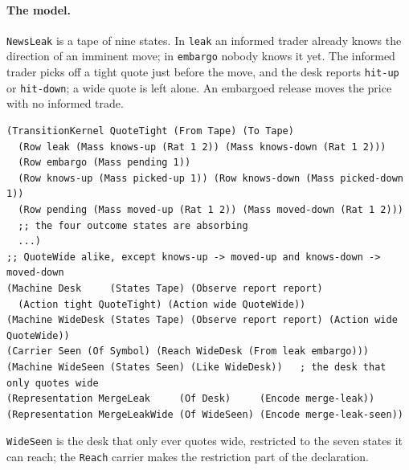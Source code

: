 \documentclass[11pt]{article}
\newcommand{\code}[1]{\texttt{#1}}
\theoremstyle{definition}
\theoremstyle{plain}
\begin{document}
\paragraph{The model.} \code{NewsLeak} is a tape of nine states. In \code{leak} an informed trader
already knows the direction of an imminent move; in \code{embargo} nobody knows it yet. The informed
trader picks off a tight quote just before the move, and the desk reports \code{hit-up} or
\code{hit-down}; a wide quote is left alone. An embargoed release moves the price with no informed trade.
\begin{lstlisting}
(TransitionKernel QuoteTight (From Tape) (To Tape)
  (Row leak (Mass knows-up (Rat 1 2)) (Mass knows-down (Rat 1 2)))
  (Row embargo (Mass pending 1))
  (Row knows-up (Mass picked-up 1)) (Row knows-down (Mass picked-down 1))
  (Row pending (Mass moved-up (Rat 1 2)) (Mass moved-down (Rat 1 2)))
  ;; the four outcome states are absorbing
  ...)
;; QuoteWide alike, except knows-up -> moved-up and knows-down -> moved-down
(Machine Desk     (States Tape) (Observe report report)
  (Action tight QuoteTight) (Action wide QuoteWide))
(Machine WideDesk (States Tape) (Observe report report) (Action wide QuoteWide))
(Carrier Seen (Of Symbol) (Reach WideDesk (From leak embargo)))
(Machine WideSeen (States Seen) (Like WideDesk))   ; the desk that only quotes wide
(Representation MergeLeak     (Of Desk)     (Encode merge-leak))
(Representation MergeLeakWide (Of WideSeen) (Encode merge-leak-seen))
\end{lstlisting}
\code{WideSeen} is the desk that only ever quotes wide, restricted to the seven states it can reach; the
\code{Reach} carrier makes the restriction part of the declaration.
\end{document}
